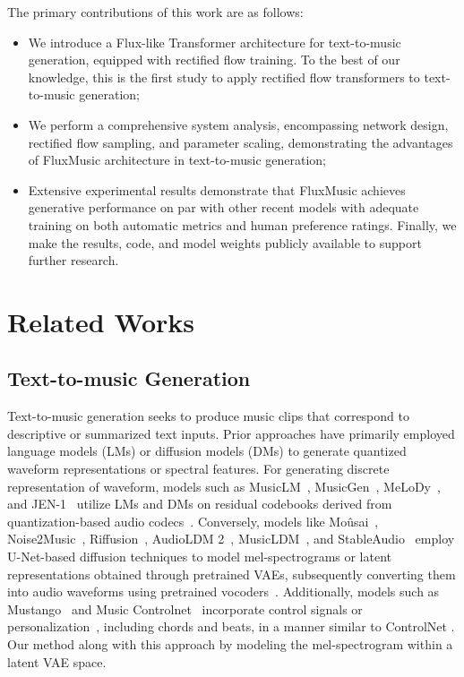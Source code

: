 The primary contributions of this work are as follows: 
\begin{itemize}
    \item We introduce a Flux-like Transformer architecture for text-to-music generation, equipped with rectified flow training. To the best of our knowledge, this is the first study to apply rectified flow transformers to text-to-music generation;
    \item  We perform a comprehensive system analysis, encompassing network design, rectified flow sampling, and parameter scaling, demonstrating the advantages of FluxMusic architecture in text-to-music generation; 
    \item Extensive experimental results demonstrate that FluxMusic achieves generative performance on par with other recent  models with adequate training on both automatic metrics and human preference ratings. Finally, we make the results, code, and model weights publicly available to support further research.  
\end{itemize}

\section{Related Works}

\subsection{Text-to-music Generation}
Text-to-music generation seeks to produce music clips that correspond to descriptive or summarized text inputs. Prior approaches have primarily employed language models (LMs) or diffusion models (DMs) to generate quantized waveform representations or spectral features. For generating discrete representation of waveform, models such as MusicLM~\cite{agostinelli2023musiclm}, MusicGen~\cite{copet2024simple}, MeLoDy~\cite{lam2024efficient}, and JEN-1~\cite{li2024jen} utilize LMs and DMs on residual codebooks derived from quantization-based audio codecs~\cite{zeghidour2021soundstream,defossez2022high}. Conversely, models like Moûsai~\cite{schneider2024mousai}, Noise2Music~\cite{huang2023noise2music}, Riffusion~\cite{forsgren2022riffusion}, AudioLDM 2~\cite{liu2024audioldm}, MusicLDM~\cite{chen2024musicldm}, and StableAudio~\cite{evans2024stable} employ U-Net-based diffusion techniques to model mel-spectrograms or latent representations obtained through pretrained VAEs, subsequently converting them into audio waveforms using pretrained vocoders~\cite{kong2020hifi}. Additionally, models such as Mustango~\cite{melechovsky2023mustango} and Music Controlnet~\cite{wu2024music} incorporate control signals or personalization~\cite{plitsis2024investigating,fei2023gradient}, including chords and beats, in a manner similar to ControlNet \cite{zhang2023adding}. Our method along with this approach by modeling the mel-spectrogram within a latent VAE space.

